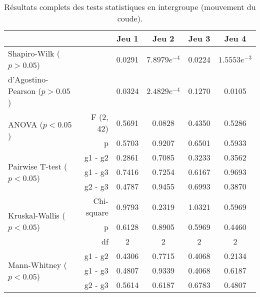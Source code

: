 \begin{table}[H]
\begin{tabular}{lr|cccc}
& & Jeu 1 & Jeu 2 & Jeu 3 & Jeu 4 \\\hline
Shapiro-Wilk ($p > 0.05$) & & 0.0291 & $7.8979e^{-4}$ & 0.0224 & $1.5553e^{-3}$ \\
d'Agostino-Pearson ($p > 0.05$) & & 0.0324 & $2.4829e^{-4}$ & 0.1270 & 0.0105 \\\hline
\multirow{2}{*}{ANOVA ($p < 0.05$)} & F (2, 42) & 0.5691 & 0.0828 & 0.4350 & 0.5286 \\
 & p & 0.5703 & 0.9207 & 0.6501 & 0.5933 \\\hline
\multirow{3}{*}{Pairwise T-test ($p < 0.05$)} & g1 - g2 & 0.2861 & 0.7085 & 0.3233 & 0.3562 \\
 & g1 - g3 & 0.7416 & 0.7254 & 0.6167 & 0.9693 \\
 & g2 - g3 & 0.4787 & 0.9455 & 0.6993 & 0.3870 \\\hline
\multirow{3}{*}{Kruskal-Wallis ($p < 0.05$)} & Chi-square & 0.9793 & 0.2319 & 1.0321 & 0.5969 \\
 & p & 0.6128 & 0.8905 & 0.5969 & 0.4460 \\
 & df & 2 & 2 & 2 & 2 \\\hline
\multirow{3}{*}{Mann-Whitney ($p < 0.05$)} & g1 - g2 & 0.4306 & 0.7715 & 0.4068 & 0.2134 \\
 & g1 - g3 & 0.4807 & 0.9339 & 0.4068 & 0.6187 \\
 & g2 - g3 & 0.5614 & 0.6187 & 0.6783 & 0.4807
\end{tabular}
\caption{Résultats complets des tests statistiques en intergroupe (mouvement du coude).}
\end{table}

